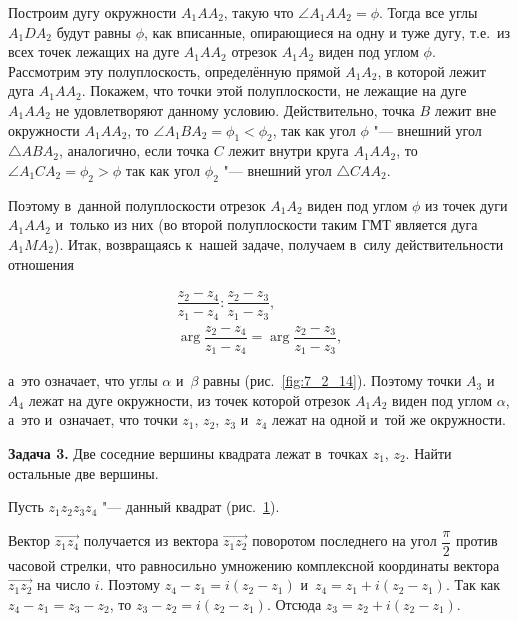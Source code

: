 Построим дугу окружности $A_{1}AA_{2}$, такую что $\angle A_{1}AA_{2} = \phi$.
Тогда все углы $A_{1}DA_{2}$ будут равны $\phi$, как вписанные, опирающиеся
на одну и туже дугу, т.е.\ из всех точек лежащих на дуге $A_{1}AA_{2}$
отрезок $A_{1}A_{2}$ виден под углом $\phi$. Рассмотрим эту полуплоскость,
определённую прямой $A_{1}A_{2}$, в которой лежит дуга $A_{1}AA_{2}$.
Покажем, что точки этой полуплоскости, не лежащие на дуге $A_{1}AA_{2}$
не удовлетворяют данному условию. Действительно, точка $B$ лежит вне окружности
$A_{1}AA_{2}$, то $\angle A_{1}BA_{2} = \phi_{1} < \phi_{2}$,
так как угол $\phi$ "--- внешний угол $\triangle ABA_{2}$, аналогично,
если точка $C$ лежит внутри круга $A_{1}AA_{2}$,
то $\angle A_{1}CA_{2} = \phi_{2} > \phi$ так как угол $\phi_{2}$
"--- внешний угол $\triangle CAA_{2}$.

Поэтому в~данной полуплоскости отрезок $A_{1}A_{2}$ виден под углом $\phi$
из точек дуги $A_{1}AA_{2}$ и~только из них (во второй полуплоскости таким
ГМТ является дуга $A_{1}MA_{2}$). Итак, возвращаясь к~нашей задаче,
получаем в~силу действительности отношения

\begin{gather*}
\dfrac{z_{2} - z_{4}}{z_{1} - z_{4}} :
\dfrac{z_{2} - z_{3}}{z_{1} - z_{3}}, \\
\arg \dfrac{z_{2} - z_{4}}{z_{1} - z_{4}} =
\arg \dfrac{z_{2} - z_{3}}{z_{1} - z_{3}},
\end{gather*}

\noindent
а~это означает, что углы $\alpha$ и~$\beta$ равны (рис.\ \ref{fig:7_2_14}).
Поэтому точки $A_{3}$ и~$A_{4}$ лежат на дуге окружности, из точек которой
отрезок $A_{1}A_{2}$  виден под углом $\alpha$, а~это и~означает, что точки
$z_{1}$, $z_{2}$, $z_{3}$ и~$z_{4}$ лежат на одной и~той же окружности.

\textbf{Задача 3.}\label{ex:7_2_3} Две соседние вершины квадрата лежат в~точках
$z_{1}$, $z_{2}$. Найти остальные две вершины.

Пусть $z_{1}z_{2}z_{3}z_{4}$ "--- данный квадрат (рис.\ \ref{fig:7_2_16}).

\begin{figure}\label{fig:7_2_16}
\end{figure}

Вектор $\overrightarrow{z_{1}z_{4}}$ получается из вектора
$\overrightarrow{z_{1}z_{2}}$ поворотом последнего на угол $\dfrac{\pi}{2}$
против часовой стрелки, что равносильно умножению комплексной координаты
вектора $\overrightarrow{z_{1}z_{2}}$ на число $i$.
Поэтому $z_{4} - z_{1} = i(z_{2} - z_{1})$ и~$z_{4} = z_{1} + i(z_{2} - z_{1})$.
Так как $z_{4} - z_{1} = z_{3} - z_{2}$, то $z_{3} - z_{2} = i(z_{2} - z_{1})$.
Отсюда $z_{3} = z_{2} + i(z_{2} - z_{1})$.

